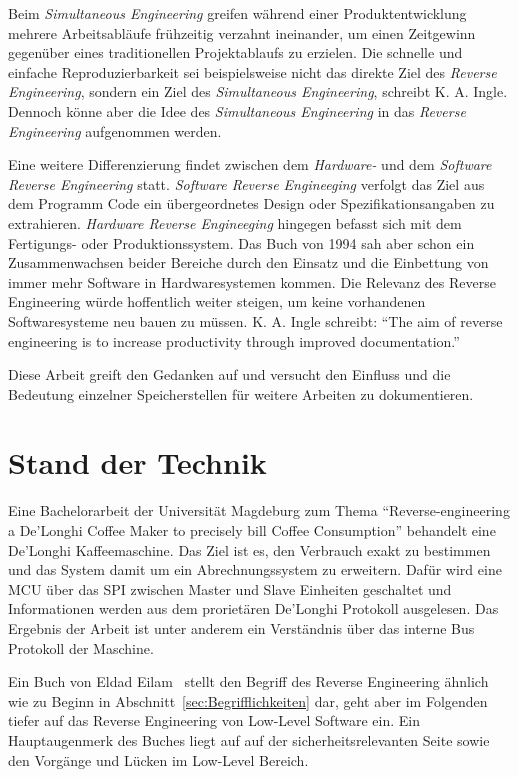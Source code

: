 Beim \textit{Simultaneous Engineering} greifen während einer Produktentwicklung mehrere Arbeitsabläufe frühzeitig verzahnt ineinander, um einen Zeitgewinn gegenüber eines traditionellen Projektablaufs zu erzielen.
Die schnelle und einfache Reproduzierbarkeit sei beispielsweise nicht das direkte Ziel des \textit{Reverse Engineering}, sondern ein Ziel des \textit{Simultaneous Engineering}, schreibt K. A. Ingle.
Dennoch könne aber die Idee des \textit{Simultaneous Engineering} in das \textit{Reverse Engineering} aufgenommen werden.

Eine weitere Differenzierung findet zwischen dem \textit{Hardware-} und dem \textit{Software Reverse Engineering} statt.
\textit{Software Reverse Engineeging} verfolgt das Ziel aus dem Programm Code ein übergeordnetes Design oder Spezifikationsangaben zu extrahieren.
\textit{Hardware Reverse Engineeging} hingegen befasst sich mit dem Fertigungs- oder Produktionssystem.
Das Buch von 1994 sah aber schon ein Zusammenwachsen beider Bereiche durch den Einsatz und die Einbettung von immer mehr Software in Hardwaresystemen kommen.
Die Relevanz des Reverse Engineering würde hoffentlich weiter steigen, um keine vorhandenen Softwaresysteme neu bauen zu müssen.
K. A. Ingle schreibt: "`The aim of reverse engineering is to increase productivity through improved documentation."'\cite{Solr-153077417}

Diese Arbeit greift den Gedanken auf und versucht den Einfluss und die Bedeutung einzelner Speicherstellen für weitere Arbeiten zu dokumentieren.

\section{Stand der Technik}
Eine Bachelorarbeit der Universität Magdeburg zum Thema "`Reverse-engineering a De'Longhi Coffee Maker to precisely bill Coffee Consumption"'\cite{BachelorarbeitDeLonghi} behandelt eine De'Longhi Kaffeemaschine.
Das Ziel ist es, den Verbrauch exakt zu bestimmen und das System damit um ein Abrechnungssystem zu erweitern.
Dafür wird eine \ac{MCU} über das \ac{SPI} zwischen Master und Slave Einheiten geschaltet und Informationen werden aus dem prorietären De'Longhi Protokoll ausgelesen.
Das Ergebnis der Arbeit ist unter anderem ein Verständnis über das interne Bus Protokoll der Maschine.

Ein Buch von Eldad Eilam~\cite{Solr-480966761} stellt den Begriff des Reverse Engineering ähnlich wie zu Beginn in Abschnitt~\ref{sec:Begrifflichkeiten} dar, geht aber im Folgenden tiefer auf das Reverse Engineering von Low-Level Software ein.
Ein Hauptaugenmerk des Buches liegt auf auf der sicherheitsrelevanten Seite sowie den Vorgänge und Lücken im Low-Level Bereich.


